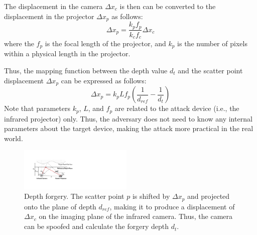 The displacement in the camera $\Delta x_c$ is then can be converted to the displacement in the projector $\Delta x_p$ as follows:
\begin{equation}
	\Delta x_p = \frac{k_pf_p}{k_cf_c}\Delta x_c 
	\label{xc_to_xp}
\end{equation}
where the $f_p$ is the focal length of the projector, and $k_p$ is the number of pixels within a physical length in the projector.

Thus, the mapping function between the depth value $d_t$ and the scatter point displacement $\Delta x_p$ can be expressed as follows:
\begin{equation}
	\Delta x_p = k_pLf_p(\frac{1}{d_{ref}} - \frac{1}{d_t}) 
	\label{xp_to_d}
\end{equation}
Note that parameters $k_p$, $L$, and $f_p$ are related to the attack device (i.e., the infrared projector) only. Thus, the adversary does not need to know any internal parameters about the target device, making the attack more practical in the real world. 

\begin{figure}[!t]
	\centering
	\includegraphics[width=0.48\textwidth]{figures/depth_forgery.pdf} 
	\vspace{-0.1in}
 	\caption{Depth forgery. The scatter point $p$ is shifted by $\Delta x_p$ and projected onto the plane of depth $d_{ref}$, making it to produce a displacement of $\Delta x_c$ on the imaging plane of the infrared camera. Thus, the camera can be spoofed and calculate the forgery depth $d_t$.}
	\label{depth_forgery}
	\vspace{-0.15in}
\end{figure}


